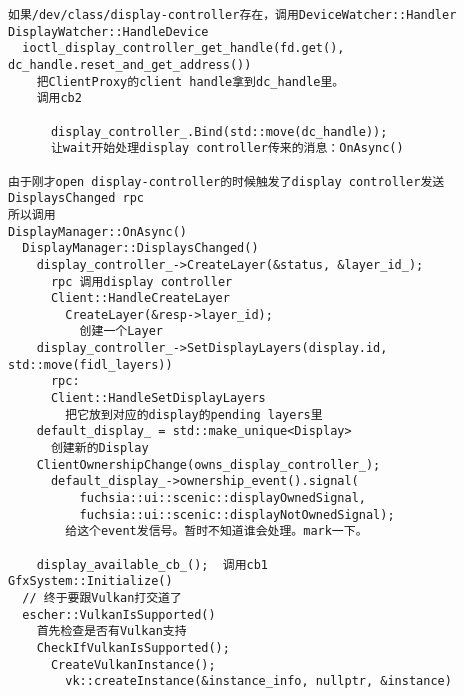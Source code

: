 \begin{verbatim}
如果/dev/class/display-controller存在，调用DeviceWatcher::Handler
DisplayWatcher::HandleDevice
  ioctl_display_controller_get_handle(fd.get(), dc_handle.reset_and_get_address())
    把ClientProxy的client handle拿到dc_handle里。
    调用cb2

      display_controller_.Bind(std::move(dc_handle));
      让wait开始处理display controller传来的消息：OnAsync()

由于刚才open display-controller的时候触发了display controller发送DisplaysChanged rpc
所以调用
DisplayManager::OnAsync()
  DisplayManager::DisplaysChanged()
    display_controller_->CreateLayer(&status, &layer_id_);
      rpc 调用display controller
      Client::HandleCreateLayer
        CreateLayer(&resp->layer_id);
          创建一个Layer
    display_controller_->SetDisplayLayers(display.id, std::move(fidl_layers))
      rpc:
      Client::HandleSetDisplayLayers
        把它放到对应的display的pending layers里
    default_display_ = std::make_unique<Display>
      创建新的Display    
    ClientOwnershipChange(owns_display_controller_);
      default_display_->ownership_event().signal(
          fuchsia::ui::scenic::displayOwnedSignal,
          fuchsia::ui::scenic::displayNotOwnedSignal);
        给这个event发信号。暂时不知道谁会处理。mark一下。

    display_available_cb_();  调用cb1
GfxSystem::Initialize()
  // 终于要跟Vulkan打交道了
  escher::VulkanIsSupported()
    首先检查是否有Vulkan支持
    CheckIfVulkanIsSupported();
      CreateVulkanInstance();
        vk::createInstance(&instance_info, nullptr, &instance)



\end{verbatim}